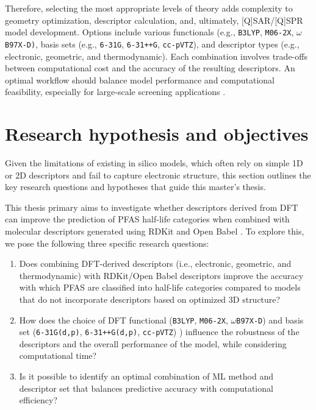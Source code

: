  
Therefore, selecting the most appropriate levels of theory adds complexity to geometry optimization, descriptor calculation, and, ultimately, [Q]SAR/[Q]SPR model development. Options include various functionals (e.g., \texttt{B3LYP}, \texttt{M06‑2X}, \texttt{$\omega$B97X-D)}, basis sets (e.g., \texttt{6‑31G}, \texttt{6‑31++G}, \texttt{cc-pVTZ}), and descriptor types (e.g., electronic, geometric, and thermodynamic). Each combination involves trade-offs between computational cost and the accuracy of the resulting descriptors. An optimal workflow should balance model performance and computational feasibility, especially for large-scale screening applications \cite{Gkika2023, Cherkasov2014}.

\chapter{Research hypothesis and objectives}

Given the limitations of existing in silico models, which often rely on simple 1D or 2D descriptors and fail to capture electronic structure, this section outlines the key research questions and hypotheses that guide this master’s thesis.

This thesis primary aims to investigate whether descriptors derived from DFT can improve the prediction of PFAS half-life categories when combined with molecular descriptors generated using RDKit \cite{rdkit} and Open Babel \cite{openbabel}. To explore this, we pose the following three specific research questions:

\begin{enumerate}
  \item Does combining DFT-derived descriptors (i.e., electronic, geometric, and thermodynamic) with RDKit/Open Babel descriptors improve the accuracy with which PFAS are classified into half-life categories compared to models that do not incorporate descriptors based on optimized 3D structure?
  
  \item How does the choice of DFT functional (\texttt{B3LYP}, \texttt{M06‑2X}, \texttt{\(\omega\)B97X‑D}) and basis set (\texttt{6-31G(d,p)}, \texttt{6-31++G(d,p)}, \texttt{cc-pVTZ}) ) influence the robustness of the descriptors and the overall performance of the model, while considering computational time?
  
  \item Is it possible to identify an optimal combination of ML method and descriptor set that balances predictive accuracy with computational efficiency?
\end{enumerate}

